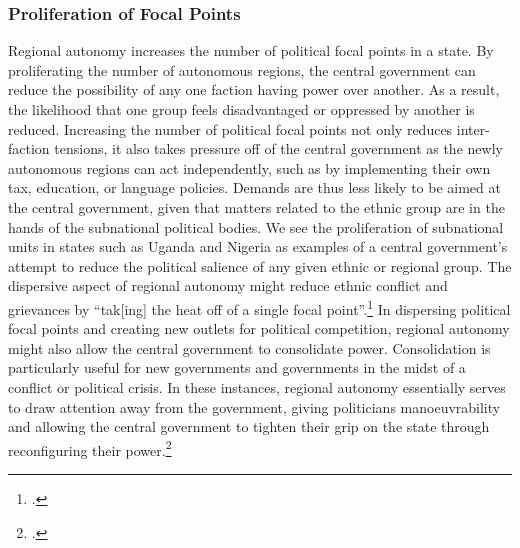 \documentclass[12pt]{article}
\begin{document}
\subsubsection{Proliferation of Focal Points}
Regional autonomy increases the number of political focal points in a state. By proliferating the number of autonomous regions, the central government can reduce the possibility of any one faction having power over another. As a result, the likelihood that one group feels disadvantaged or oppressed by another is reduced. Increasing the number of political focal points not only reduces inter-faction tensions, it also takes pressure off of the central government as the newly autonomous regions can act independently, such as by implementing their own tax, education, or language policies. Demands are thus less likely to be aimed at the central government, given that matters related to the ethnic group are in the hands of the subnational political bodies. We see the proliferation of subnational units in states such as Uganda and Nigeria as examples of a central government’s attempt to reduce the political salience of any given ethnic or regional group. The dispersive aspect of regional autonomy might reduce ethnic conflict and grievances by ``tak[ing] the heat off of a single focal point''.\footcite[598]{horowitz_ethnic_1985} In dispersing political focal points and creating new outlets for political competition, regional autonomy might also allow the central government to consolidate power. Consolidation is particularly useful for new governments and governments in the midst of a conflict or political crisis. In these instances, regional autonomy essentially serves to draw attention away from the government, giving politicians manoeuvrability and allowing the central government to tighten their grip on the state through reconfiguring their power.\footcite{seely_political_2001, gasper_decentralization_1989}
\end{document}
